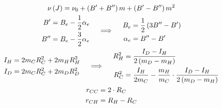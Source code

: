 \documentclass[14pt]{extarticle}
\newcommand{\lb}{\left(}
\newcommand{\rb}{\right)}
\newcommand{\dprime}{{\prime\prime}}
\begin{document}
\begin{gather}
	\nu \lb J \rb = \nu_0 + \lb B^\prime + B^{\prime\prime} \rb m + \lb B^\prime - B^{\prime\prime} \rb m^2 \notag \\
	\begin{aligned}
		B^\prime = B_e - \frac{1}{2} \alpha_e \\
		B^\dprime = B_e - \frac{3}{2} \alpha_e 
	\end{aligned}
	\quad \implies \quad
	\begin{aligned}
		B_e &= \frac{1}{2} \lb 3 B^\dprime - B^\prime \rb \\
		\alpha_e &= B^\dprime - B^\prime
	\end{aligned} \notag \\
	\begin{aligned}
		I_H &= 2 m_C R_C^2 + 2 m_H R_H^2 \\
		I_D &= 2 m_C R_C^2 + 2 m_D R_D^2 
	\end{aligned}
	\quad \implies \quad 
	\begin{aligned}
		R_H^2 &= \frac{I_D - I_H}{2 \lb m_D - m_H \rb} \\
		R_C^2 &= \frac{I_H}{2 m_C} - \frac{m_H}{m_C} \cdot \frac{I_D - I_H}{2 \lb m_D - m_H \rb}
	\end{aligned} \notag \\
	\begin{aligned}
		r_{CC} &= 2 \cdot R_C \\
		r_{CH} &= R_{H} - R_C
	\end{aligned} \notag
\end{gather}
\end{document}
